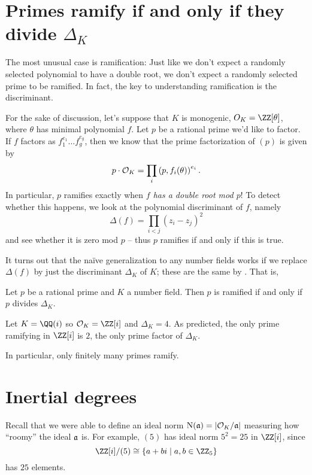 \section{Primes ramify if and only if they divide $\Delta_K$}
The most unusual case is ramification:
Just like we don't expect a randomly selected polynomial to have a double root,
we don't expect a randomly selected prime to be ramified.
In fact, the key to understanding ramification is the discriminant.

For the sake of discussion, let's suppose that $K$ is monogenic, $O_K = \ZZ[\theta]$,
where $\theta$ has minimal polynomial $f$.
Let $p$ be a rational prime we'd like to factor.
If $f$ factors as $f_1^{e_1} \dots f_g^{e_g}$, then we know that
the prime factorization of $(p)$ is given by
\[ p \cdot \OO_K = \prod_i \left( p, f_i(\theta) \right)^{e_i}. \]
In particular, $p$ ramifies exactly when \emph{$f$ has a double root mod $p$}!
To detect whether this happens, we look at the polynomial discriminant of $f$,
namely
\[ \Delta(f) = \prod_{i<j} (z_i - z_j)^2 \]
and see whether it is zero mod $p$ -- thus $p$ ramifies if and only if this is true.

It turns out that the na\"ive generalization to any number fields
works if we replace $\Delta(f)$ by just the discriminant $\Delta_K$ of $K$;
these are the same by .
That is,
\begin{theorem}
	Let $p$ be a rational prime and $K$ a number field.
	Then $p$ is ramified if and only if $p$ divides $\Delta_K$.
\end{theorem}
\begin{example}
	Let $K = \QQ(i)$ so $\OO_K = \ZZ[i]$ and $\Delta_K = 4$.
	As predicted, the only prime ramifying in $\ZZ[i]$ is $2$,
	the only prime factor of $\Delta_K$.
\end{example}
In particular, only finitely many primes ramify.

\section{Inertial degrees}

Recall that we were able to define an ideal norm $\Norm(\aa) = \left\lvert \OO_K / \aa \right\rvert$
measuring how ``roomy'' the ideal $\aa$ is.
For example, $(5)$ has ideal norm $5^2 = 25$ in $\ZZ[i]$, since
\[ \ZZ[i] / (5) \cong \left\{ a+bi \mid a,b \in \ZZ_5 \right\} \]
has $25$ elements.


